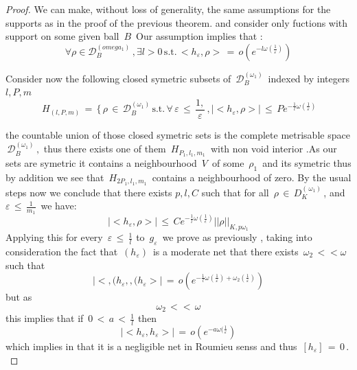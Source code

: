 \documentclass[12pt,a4paper]{amsart}
\begin{document}
 \begin{proof}
 We can make, without loss of generality, the same assumptions for the supports as in the proof of the previous theorem. and consider only fuctions with support on some given ball $\,B\,$
 Our assumption implies that :
  \begin{equation*}
 \forall \rho
 \in \mathcal{D}_B^{(omega_1)}\,,\exists l>0 \,\mbox{s.t.}
 \,<h_\varepsilon,\rho>\,=\,
  o(e^{-l\omega(\frac{1}{\varepsilon})})
  \end{equation*}
  
  Consider now the following closed symetric subsets of 
  $\,\mathcal{D}_B^{(\omega_1)}\,$
  indexed by integers $l,P,m$
  $$ \,H_(l,P,m)\,=\, \{\,\rho\,\in\,\mathcal{D}_B^{(\omega_1)}\,
  \mbox{s.t.}\,\forall\, \varepsilon\,\leq \,
  \frac{1,}{\varepsilon}\,,  
  |<h_\varepsilon,\rho>|\,\leq\,
   Pe^{-\frac{1}{l}\omega(\frac{1}{\varepsilon})}$$
   

  
 
 the countable union of those closed symetric sets 
  is the complete metrisable space 
  $\,\mathcal{D}_B^{(\omega_1)}\,,$  thus there exists one of them $\, H_{P_1,l_1,m_1}\,$    with non void interior .As our sets are symetric it contains a neighbourhood
  $\,V\,$ of some $\,\rho_1\,$ and its symetric thus by addition we see that $\, H_{2P_1,l_1,m_1}\,$  contains a neighbourhood of zero.  By the usual steps now we conclude that there exists $p, l , C$ such that 
  for all $\,\rho\,\in\, D_K^{(\,\omega_1)}\,$, and 
  $\varepsilon\,\leq\,\frac{1}{m_1}\,$
  we have:
  $$\, |<h_\varepsilon,\rho>|\,\leq\,
 Ce^{-\frac{1}{l}\omega(\frac{1}{\epsilon})}||\rho||_{K,p\omega_1}\,$$
   Applying this for every $\,\varepsilon\,\leq\,\frac{1}{l}  $ 
   to
    $\,g_\varepsilon\,$ we prove as previously , taking into consideration the fact that $\,(h_\varepsilon) \, $ is a moderate net that there exists $\,\omega_2\,<<\omega\,$ such that
    $$|<,(h_\varepsilon,,(h_\varepsilon>|\,=\,
    o(e^{-\frac{1}{l}\omega(\frac{1}{\varepsilon})+
    \omega_2(\frac{1}{\varepsilon})})$$
    but as $$\omega_2 \,<<\,\omega $$
    this implies that if $\,0\,<\,a\,< \,\frac{1}{l}$ then 
    $$|<h_\varepsilon, h_\varepsilon>|\,=\,o(e^{-a\omega(\frac{1}{\varepsilon}})$$ which implies in that it is a negligible net in Roumieu senss and thus $\,[h_\varepsilon] \,=\,0\,.$
    
    
 
 \end{proof}
 
\end{document}
